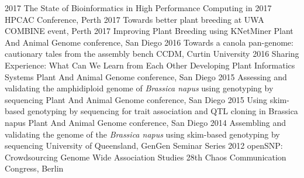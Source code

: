 \documentclass[]{friggeri-cv} %
\begin{document}
\begin{entrylist}
\entry
{2017}
{The State of Bioinformatics in High Performance Computing in 2017}
{}
{HPCAC Conference, Perth}
\entry
{2017}
{Towards better plant breeding at UWA}
{}
{COMBINE event, Perth}
\entry
{2017}
{Improving Plant Breeding using KNetMiner}
{}
{Plant And Animal Genome conference, San Diego}
\entry
{2016}
{Towards a canola pan-genome: cautionary tales from the assembly bench}
{}
{CCDM, Curtin University}
\entry
{2016}
{Sharing Experience: What Can We Learn from Each Other Developing Plant Informatics Systems}
{}
{Plant And Animal Genome conference, San Diego}
\entry
{2015}
{Assessing and validating the amphidiploid genome of \textit{Brassica napus} using genotyping by sequencing}
{}
{Plant And Animal Genome conference, San Diego}
\entry
{2015}
{Using skim-based genotyping by sequencing for trait association and QTL cloning in Brassica napus}
{}
{Plant And Animal Genome conference, San Diego}
\entry
{2014}
{Assembling and validating the genome of the \textit{Brassica napus} using skim-based genotyping by sequencing}
{}
{University of Queensland, GenGen Seminar Series}
\entry
{2012}
{openSNP: Crowdsourcing Genome Wide Association Studies}
{}
{28th Chaos Communication Congress, Berlin}
\end{entrylist}
\end{document}
